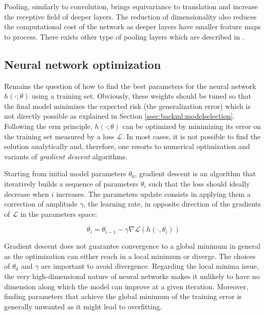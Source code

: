 Pooling, similarly to convolution, brings equivariance to translation and increase the receptive field of deeper layers. The reduction of dimensionality also reduces the computational cost of the network as deeper layers have smaller feature maps to process. There exists other type of pooling layers which are described in \parencite{gholamalinezhad2020pooling}.   

\subsection{Neural network optimization}
\label{ssec:backml:dl:opti}
Remains the question of how to find the best parameters for the neural network $h(\cdot; \theta)$ using a training set. Obviously, these weights should be tuned so that the final model minimizes the expected risk (\ie the generalization error) which is not directly possible as explained in Section \ref{ssec:backml:modelselection}. Following the \acrshort{erm} principle, $h(\cdot; \theta)$ can be optimized by minimizing its error on the training set measured by a loss $\mathcal{L}$. In most cases, it is not possible to find the solution analytically and, therefore, one resorts to numerical optimization and variants of \textit{gradient descent} algorithms.

Starting from initial model parameters $\theta_0$, gradient descent is an algorithm that iteratively builds a sequence of parameters $\theta_i$ such that the loss should ideally decrease when $i$ increases. The parameters update consists in applying them a correction of amplitude $\gamma$, the learning rate, in opposite direction of the gradients of $\mathcal{L}$ in the parameters space:

\begin{equation}
\label{eqn:backml:gradientdescent}
\theta_{i} = \theta_{i-1} - \gamma \nabla \mathcal{L}(h(\cdot, \theta_{i})) 
\end{equation}

Gradient descent does not guarantee convergence to a global minimum in general as the optimization can either reach in a local minimum or diverge. The choices of $\theta_0$ and $\gamma$ are important to avoid divergence. Regarding the local minima issue, the very high-dimensional nature of neural networks makes it unlikely to have no dimension along which the model can improve at a given iteration. Moreover, finding parameters that achieve the global minimum of the training error is generally unwanted as it might lead to overfitting.

